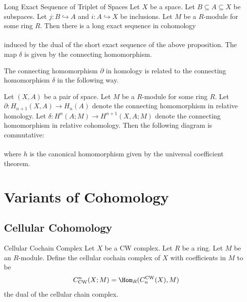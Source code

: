 \documentclass[a4paper]{article}
\begin{document}
\begin{thm}{Long Exact Sequence of Triplet of Spaces}{} Let $X$ be a space. Let $B\subseteq A\subseteq X$ be subspaces. Let $j:B\hookrightarrow A$ and $i:A\hookrightarrow X$ be inclusions. Let $M$ be a $R$-module for some ring $R$. Then there is a long exact sequence in cohomology \\
\\
induced by the dual of the short exact sequence of the above proposition. The map $\delta$ is given by the connecting homomorphism. 
\end{thm}

The connecting homomorphism $\partial$ in homology is related to the connecting homomorphism $\delta$ in the following way. 

\begin{prp}{}{} Let $(X,A)$ be a pair of space. Let $M$ be a $R$-module for some ring $R$. Let $\partial:H_{n+1}(X,A)\to H_n(A)$ denote the connecting homomorphism in relative homology. Let $\delta:H^n(A;M)\to H^{n+1}(X,A;M)$ denote the connecting homomorphism in relative cohomology. Then the following diagram is commutative: \\
\\
where $h$ is the canonical homomorphism given by the universal coefficient theorem. 
\end{prp}

\pagebreak
\section{Variants of Cohomology}
\subsection{Cellular Cohomology}
\begin{defn}{Cellular Cochain Complex}{} Let $X$ be a CW complex. Let $R$ be a ring. Let $M$ be an $R$-module. Define the cellular cochain complex of $X$ with coefficients in $M$ to be $$C_\text{CW}^n(X;M)=\Hom_R(C_n^\text{CW}(X),M)$$ the dual of the cellular chain complex. 
\end{defn}
\end{document}
